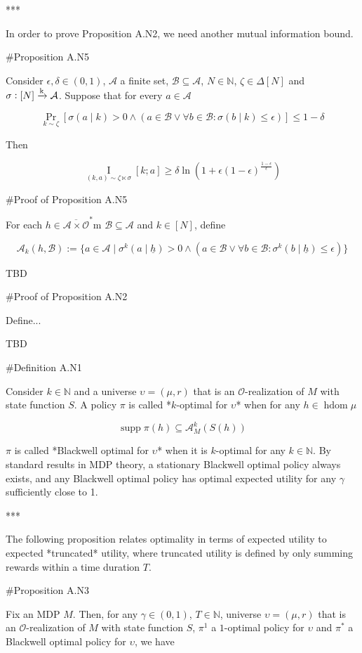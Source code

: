 \documentclass[a4paper]{article}
\DeclareMathOperator{\Supp}{supp}
\newcommand{\AP}[1]{\left(#1\right)}
\newcommand{\AB}[1]{\left[#1\right]}
\newcommand{\Pa}[2]{\underset{#1}{\operatorname{Pr}}\AB{#2}}
\newcommand{\Ia}[2]{\underset{#1}{\operatorname{I}}\AB{#2}}
\newcommand{\Nats}{\mathbb{N}}
\newcommand{\M}{\xrightarrow{\textnormal{k}}}
\newcommand{\Ob}{\mathcal{O}}
\newcommand{\A}{\mathcal{A}}
\newcommand{\Adao}{\overline{\A \times \Ob}}
\newcommand{\Adfh}{\Adao^*}
\DeclareMathOperator{\HD}{hdom}
\newcommand{\B}{\mathcal{B}}
\begin{document}
***

In order to prove Proposition A.N2, we need another mutual information bound.

\#Proposition A.N5

Consider $\epsilon,\delta \in (0,1)$, $\A$ a finite set, $\B \subseteq \A$, $N \in \Nats$, $\zeta \in \Delta[N]$ and $\sigma: [N] \M \A$. Suppose that for every $a \in \A$

$$\Pa{k \sim \zeta}{\sigma(a \mid k) > 0 \land \AP{a \in \B \lor \forall b \in \B: \sigma(b \mid k) \leq \epsilon}} \leq 1 - \delta$$

Then

$$\Ia{(k,a)\sim\zeta\ltimes\sigma}{k;a} \geq \delta \ln\left(1 + \epsilon(1-\epsilon)^{\frac{1-\epsilon}{\epsilon}}\right)$$

\#Proof of Proposition A.N5

For each $h \in \Adfh$m $\B \subseteq \A$ and $k \in [N]$, define

$$\A_k(h, \B):=\{a \in \A \mid \sigma^k\AP{a \mid \underline{h}} > 0 \land \AP{a \in \B \lor \forall b \in \B: \sigma^k\AP{b \mid \underline{h}} \leq \epsilon}\}$$

TBD

\#Proof of Proposition A.N2

Define...

TBD

\#Definition A.N1

Consider $k \in \Nats$ and a universe $\upsilon=(\mu,r)$ that is an $\Ob$-realization of $M$ with state function $S$. A policy $\pi$ is called *$k$-optimal for $\upsilon$* when for any $h \in \HD{\mu}$

$$\Supp \pi(h) \subseteq \A_M^k\left(S(h)\right)$$

$\pi$ is called *Blackwell optimal for $\upsilon$* when it is $k$-optimal for any $k \in \Nats$. By standard results in MDP theory, a stationary Blackwell optimal policy always exists, and any Blackwell optimal policy has optimal expected utility for any $\gamma$ sufficiently close to 1.

***

The following proposition relates optimality in terms of expected utility to expected *truncated* utility, where truncated utility is defined by only summing rewards within a time duration $T$.

\#Proposition A.N3

Fix an MDP $M$. Then, for any $\gamma\in(0,1)$, $T \in \Nats$, universe $\upsilon=(\mu,r)$ that is an $\Ob$-realization of $M$ with state function $S$, $\pi^1$ a $1$-optimal policy for $\upsilon$ and $\pi^*$ a Blackwell optimal policy for $\upsilon$, we have
\end{document}
